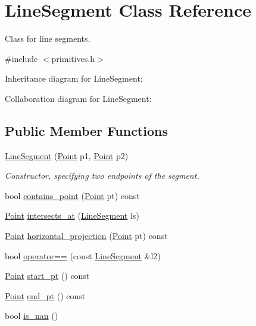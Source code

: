 \hypertarget{classLineSegment}{}\section{Line\+Segment Class Reference}
\label{classLineSegment}


Class for line segments.  




{\ttfamily \#include $<$primitives.\+h$>$}



Inheritance diagram for Line\+Segment\+:


Collaboration diagram for Line\+Segment\+:
\subsection*{Public Member Functions}
\begin{DoxyCompactItemize}
\item 
\hyperlink{classLineSegment_a691e185edf3aa7e2dc12307f9ef4be6b}{Line\+Segment} (\hyperlink{classPoint}{Point} p1, \hyperlink{classPoint}{Point} p2)
\begin{DoxyCompactList}\small\item\em Constructor, specifying two endpoints of the segment. \end{DoxyCompactList}\item 
bool \hyperlink{classLineSegment_a8dc46fa1dd259befff8cea92232e2a29}{contains\+\_\+point} (\hyperlink{classPoint}{Point} pt) const
\item 
\hyperlink{classPoint}{Point} \hyperlink{classLineSegment_a3bdc73ce4696a76b7c7dd143556c95b6}{intersects\+\_\+at} (\hyperlink{classLineSegment}{Line\+Segment} ls)
\item 
\hyperlink{classPoint}{Point} \hyperlink{classLineSegment_a51a9d2fcca6b3ff03cb51fd4d8fae4ba}{horizontal\+\_\+projection} (\hyperlink{classPoint}{Point} pt) const
\item 
bool \hyperlink{classLineSegment_ae73906b7230adbccf243c4b8dc6482b3}{operator==} (const \hyperlink{classLineSegment}{Line\+Segment} \&l2)
\item 
\hyperlink{classPoint}{Point} \hyperlink{classLineSegment_abe9136323cfe46be663907cbc1e3da2d}{start\+\_\+pt} () const
\item 
\hyperlink{classPoint}{Point} \hyperlink{classLineSegment_aa6c90340de500bb72bdde2114f838d57}{end\+\_\+pt} () const
\item 
bool \hyperlink{classLineSegment_a3364f7089cf7b650efe389475ddd0f12}{is\+\_\+nan} ()
\end{DoxyCompactItemize}
